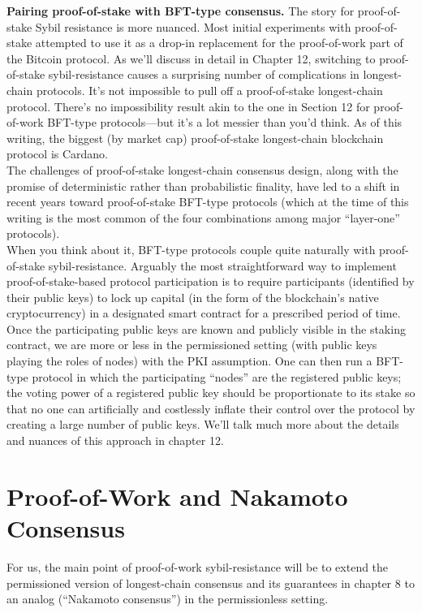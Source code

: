 \noindent
\textbf{Pairing proof-of-stake with BFT-type consensus.} The story for proof-of-stake Sybil resistance is more nuanced. Most initial experiments with proof-of-stake attempted to use it
as a drop-in replacement for the proof-of-work part of the Bitcoin protocol. As we’ll discuss
in detail in Chapter 12, switching to proof-of-stake sybil-resistance causes a surprising number
of complications in longest-chain protocols. It’s not impossible to pull off a proof-of-stake
longest-chain protocol. There’s no impossibility result akin to the one in Section 12 for proof-of-work BFT-type protocols—but it’s a lot messier than you’d think. As of this writing, the
biggest (by market cap) proof-of-stake longest-chain blockchain protocol is Cardano.\\

The challenges of proof-of-stake longest-chain consensus design, along with the promise
of deterministic rather than probabilistic finality, have led to a shift in recent years toward
proof-of-stake BFT-type protocols (which at the time of this writing is the most common of
the four combinations among major “layer-one” protocols).\\

When you think about it, BFT-type protocols couple quite naturally with proof-of-stake
sybil-resistance. Arguably the most straightforward way to implement proof-of-stake-based
protocol participation is to require participants (identified by their public keys) to lock up
capital (in the form of the blockchain’s native cryptocurrency) in a designated smart contract
for a prescribed period of time. Once the participating public keys are known and publicly
visible in the staking contract, we are more or less in the permissioned setting (with public
keys playing the roles of nodes) with the PKI assumption. One can then run a BFT-type
protocol in which the participating “nodes” are the registered public keys; the voting power
of a registered public key should be proportionate to its stake so that no one can artificially and costlessly inflate their control over the protocol by creating a large number of public
keys. We’ll talk much more about the details and nuances of this approach in chapter 12.\\

\section{Proof-of-Work and Nakamoto Consensus}
For us, the main point of proof-of-work sybil-resistance will be to extend the permissioned
version of longest-chain consensus and its guarantees in chapter 8 to an analog (“Nakamoto
consensus”) in the permissionless setting.
